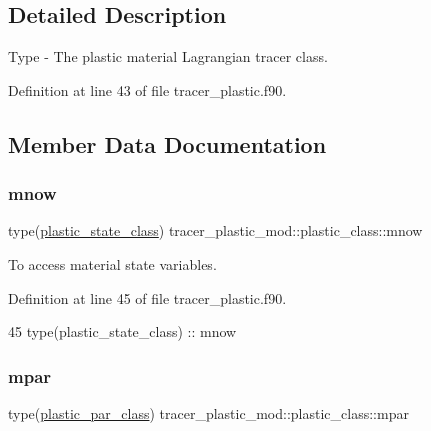 \subsection{Detailed Description}
Type -\/ The plastic material Lagrangian tracer class. 

Definition at line 43 of file tracer\+\_\+plastic.\+f90.



\subsection{Member Data Documentation}
\mbox{\label{structtracer__plastic__mod_1_1plastic__class_ae30b971a131c8203026a7631dff3a51f}} 
\subsubsection{\texorpdfstring{mnow}{mnow}}
{\footnotesize\ttfamily type(\mbox{\hyperlink{structtracer__plastic__mod_1_1plastic__state__class}{plastic\+\_\+state\+\_\+class}}) tracer\+\_\+plastic\+\_\+mod\+::plastic\+\_\+class\+::mnow\hspace{0.3cm}{\ttfamily [private]}}



To access material state variables. 



Definition at line 45 of file tracer\+\_\+plastic.\+f90.


\begin{DoxyCode}
45         \textcolor{keywordtype}{type}(plastic\_state\_class) :: mnow
\end{DoxyCode}
\mbox{\label{structtracer__plastic__mod_1_1plastic__class_ae1a94a8bd2796aa13dfa820845f56563}} 
\subsubsection{\texorpdfstring{mpar}{mpar}}
{\footnotesize\ttfamily type(\mbox{\hyperlink{structtracer__plastic__mod_1_1plastic__par__class}{plastic\+\_\+par\+\_\+class}}) tracer\+\_\+plastic\+\_\+mod\+::plastic\+\_\+class\+::mpar\hspace{0.3cm}{\ttfamily [private]}}



